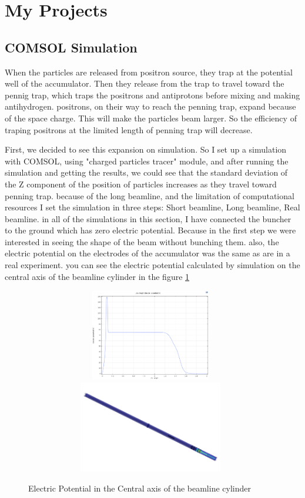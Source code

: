 \documentclass{article}
\begin{document}
\section{My Projects}
\subsection{COMSOL Simulation}
When the particles are released from positron source, they trap at the potential well of the accumulator. Then they release from the trap to travel toward the pennig trap, which traps the positrons and antiprotons before mixing and making antihydrogen.  positrons, on their way to reach the penning trap, expand because of the space charge. This will make the particles beam larger. So the efficiency of traping positrons at the limited length of penning trap will decrease.


First, we decided to see this expansion on simulation. So I set up a simulation with COMSOL, using "charged particles tracer" module, and after running the simulation and getting the results, we could see that the standard deviation of the Z component of the position of particles increases as they travel toward penning trap. because of the long beamline, and the limitation of computational resources I set the simulation in three steps: Short beamline, Long beamline, Real beamline. in all of the simulations in this section, I have connected the buncher to the ground which has zero electric potential. Because in the first step we were interested in seeing the shape of the beam without bunching them. also, the electric potential on the electrodes of the accumulator was the same as are in a real experiment. you can see the electric potential calculated by simulation on the central axis of the beamline cylinder in the figure \ref{potential}

\begin{figure}[h]

\centering
\includegraphics[width=110mm, height=40mm]{potential}
\includegraphics[width=110mm, height=40mm]{potential3D}
\caption{Electric Potential in the Central axis of the beamline cylinder}
\label{potential}
\end{figure}
\end{document}
